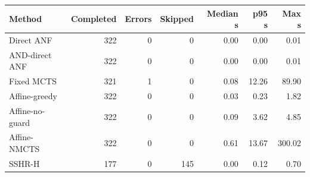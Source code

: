 \begin{tabular}{lrrrrrr}
\toprule
Method & Completed & Errors & Skipped & Median s & p95 s & Max s \\
\midrule
Direct ANF & 322 & 0 & 0 & 0.00 & 0.00 & 0.01 \\
AND-direct ANF & 322 & 0 & 0 & 0.00 & 0.00 & 0.01 \\
Fixed MCTS & 321 & 1 & 0 & 0.08 & 12.26 & 89.90 \\
Affine-greedy & 322 & 0 & 0 & 0.03 & 0.23 & 1.82 \\
Affine-no-guard & 322 & 0 & 0 & 0.09 & 3.62 & 4.85 \\
Affine-NMCTS & 322 & 0 & 0 & 0.61 & 13.67 & 300.02 \\
SSHR-H & 177 & 0 & 145 & 0.00 & 0.12 & 0.70 \\
\bottomrule
\end{tabular}
